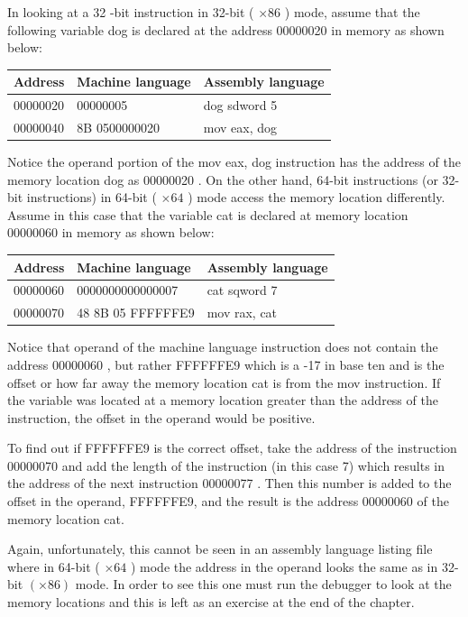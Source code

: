 \documentclass[10pt]{book}
\begin{document}
In looking at a 32 -bit instruction in 32-bit ( $\times 86$ ) mode, assume that the following variable dog is declared at the address 00000020 in memory as shown below:

\begin{center}
\begin{tabular}{|l|l|l|}
\hline
Address & Machine language & Assembly language \\
\hline
00000020 & 00000005 & dog sdword 5 \\
\hline
00000040 & 8B 0500000020 & mov eax, dog \\
\hline
\end{tabular}
\end{center}

Notice the operand portion of the mov eax, dog instruction has the address of the memory location dog as 00000020 . On the other hand, 64-bit instructions (or 32-bit instructions) in 64-bit ( $\times 64$ ) mode access the memory location differently. Assume in this case that the variable cat is declared at memory location 00000060 in memory as shown below:

\begin{center}
\begin{tabular}{|l|l|l|}
\hline
Address & Machine language & Assembly language \\
\hline
00000060 & 0000000000000007 & cat sqword 7 \\
\hline
00000070 & 48 8B 05 FFFFFFE9 & mov rax, cat \\
\hline
\end{tabular}
\end{center}

Notice that operand of the machine language instruction does not contain the address 00000060 , but rather FFFFFFE9 which is a -17 in base ten and is the offset or how far away the memory location cat is from the mov instruction. If the variable was located at a memory location greater than the address of the instruction, the offset in the operand would be positive.

To find out if FFFFFFE9 is the correct offset, take the address of the instruction 00000070 and add the length of the instruction (in this case 7) which results in the address of the next instruction 00000077 . Then this number is added to the offset in the operand, FFFFFFE9, and the result is the address 00000060 of the memory location cat.

Again, unfortunately, this cannot be seen in an assembly language listing file where in 64-bit ( $\times 64$ ) mode the address in the operand looks the same as in 32-bit $(\times 86)$ mode. In order to see this one must run the debugger to look at the memory locations and this is left as an exercise at the end of the chapter.
\end{document}
